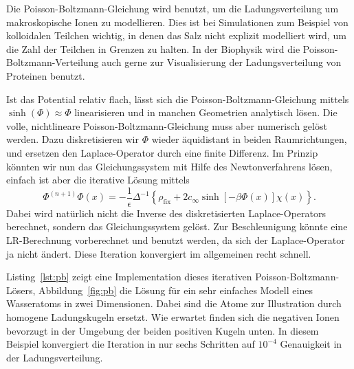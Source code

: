 Die Poisson-Boltzmann-Gleichung wird benutzt, um die Ladungsverteilung
um makroskopische Ionen zu modellieren. Dies ist bei Simulationen zum
Beispiel von kolloidalen Teilchen wichtig, in denen das Salz nicht
explizit modelliert wird, um die Zahl der Teilchen in Grenzen zu
halten. In der Biophysik wird die Poisson-Boltzmann-Verteilung auch
gerne zur Visualisierung der Ladungsverteilung von Proteinen benutzt.

Ist das Potential relativ flach, lässt sich die
Poisson-Boltzmann-Gleichung mittels $\sinh(\Phi)\approx \Phi$
linearisieren und in manchen Geometrien analytisch lösen. Die volle,
nichtlineare Poisson-Boltzmann-Gleichung muss aber numerisch gelöst
werden. Dazu diskretisieren wir $\Phi$ wieder äquidistant in beiden
Raumrichtungen, und ersetzen den Laplace-Operator durch eine finite
Differenz. Im Prinzip könnten wir nun das Gleichungssystem mit Hilfe
des Newtonverfahrens lösen, einfach ist aber die iterative Lösung
mittels
\begin{equation}
  \Phi^{(n+1)}\Phi(x)  = -\frac{1}{\epsilon}\Delta^{-1}\left\{
    \rho_\text{fix} + 2c_\infty\sinh[-\beta \Phi(x)]\chi(x)\right\}.
\end{equation}
Dabei wird natürlich nicht die Inverse des diskretisierten
Laplace-Operators berechnet, sondern das Gleichungssystem gelöst. Zur
Beschleunigung könnte eine LR-Berechnung vorberechnet und benutzt
werden, da sich der Laplace-Operator ja nicht ändert. Diese Iteration
konvergiert im allgemeinen recht schnell.

Listing~\ref{lst:pb} zeigt eine Implementation dieses iterativen
Poisson-Boltzmann-Lösers, Abbildung~\ref{fig:pb} die Lösung für ein
sehr einfaches Modell eines Wasseratoms in zwei Dimensionen. Dabei
sind die Atome zur Illustration durch homogene Ladungskugeln
ersetzt. Wie erwartet finden sich die negativen Ionen bevorzugt in der
Umgebung der beiden positiven Kugeln unten. In diesem Beispiel
konvergiert die Iteration in nur sechs Schritten auf $10^{-4}$
Genauigkeit in der Ladungsverteilung.

%

